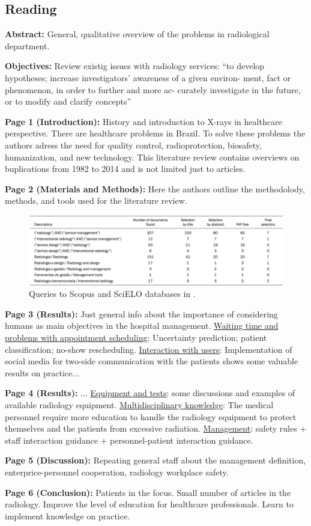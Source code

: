 \subsection{Reading}
    \textbf{Abstract:}
    General, qualitative overview of the problems in radiological department.
    
    \textbf{Objectives:}
    Review existig issues with radiology services: “to develop hypotheses; increase investigators’ awareness of a given environ- ment, fact or phenomenon, in order to further and more ac- curately investigate in the future, or to modify and clarify concepts”
    
    \textbf{Page 1 (Introduction):}
    History and introduction to X-rays in healthcare perspective. There are healthcare problems in Brazil. To solve these problems the authors adress the need for quality control, radioprotection, biosafety, humanization, and new technology. This literature review contains overviews on buplications from 1982 to 2014 and is not limited just to articles. 
    
    \textbf{Page 2 (Materials and Methods):}
    Here the authors outline the methodolody, methods, and tools used for the literature review.
    
    \begin{figure}[H]
        \centering
        \includegraphics[width=.7\textwidth]{figures/0016_SR01BR15/fig1.png}
        \caption{Queries to Scopus and SciELO databases in \cite{x073}.}
        \label{fig1:0016_SR01BR15}
    \end{figure}
    
    \textbf{Page 3 (Results):}
    Just general info about the importance of considering humans as main objectives in the hospital management. \underline{Waiting time and problems with appointment scheduling}: Uncertainty prediction; patient classification; no-show rescheduling. \underline{Interaction with users}: Implementation of social media for two-side communication with the patients shows some valuable results on practice... 

    \textbf{Page 4 (Results):}
    ... \underline{Equipment and tests}: some discussions and examples of available radiology equipment. \underline{Multidisciplinary knowledge}: The medical personnel require more education to handle the radiology equipment to protect themselves and the patients from excessive radiation. \underline{Management}: safety rules + staff interaction guidance + personnel-patient interaction guidance.

    \textbf{Page 5 (Discussion):}
    Repeating general staff about the management definition, enterprice-personnel cooperation, radiology workplace safety.
    
    \textbf{Page 6 (Conclusion):}
    Patients in the focus. Small number of articles in the radiology. Improve the level of education for healthcare professionals. Learn to implement knowledge on practice.